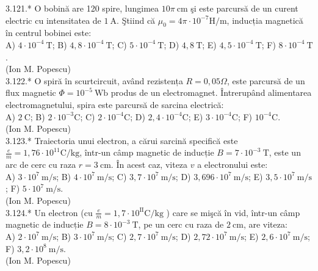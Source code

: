 3.121.* O bobină are 120 spire, lungimea $10 \pi \mathrm{~cm}$ şi este parcursă de un curent electric cu intensitatea de $1 \mathrm{~A}$. Ştiind că $\mu_{0}=4 \pi \cdot 10^{-7} \mathrm{H} / \mathrm{m}$, inducția magnetică în centrul bobinei este:\\ A) $4 \cdot 10^{-4} \mathrm{~T}$; B) $4,8 \cdot 10^{-4} \mathrm{~T}$; C) $5 \cdot 10^{-4} \mathrm{~T}$; D) $4,8 \mathrm{~T}$; E) $4,5 \cdot 10^{-4} \mathrm{~T}$; F) $8 \cdot 10^{-4} \mathrm{~T}$.\\ (Ion M. Popescu)\\

3.122.* O spiră în scurtcircuit, având rezistența $R=0,05 \Omega$, este parcursă de un flux magnetic $\Phi=10^{-5} \mathrm{~Wb}$ produs de un electromagnet. Întrerupând alimentarea electromagnetului, spira este parcursă de sarcina electrică:\\ A) $2 \mathrm{~C}$; B) $2 \cdot 10^{-3} \mathrm{C}$; C) $2 \cdot 10^{-4} \mathrm{C}$; D) $2,4 \cdot 10^{-4} \mathrm{C}$; E) $3 \cdot 10^{-4} \mathrm{C}$; F) $10^{-4} \mathrm{C}$.\\ (Ion M. Popescu)\\

3.123.* Traiectoria unui electron, a cărui sarcină specifică este $\frac{e}{m}=1,76 \cdot 10^{11} \mathrm{C} / \mathrm{kg}$, într-un câmp magnetic de inducție $B=7 \cdot 10^{-3} \mathrm{~T}$, este un arc de cerc cu raza $r=3 \mathrm{~cm}$. În acest caz, viteza $v$ a electronului este:\\ A) $3 \cdot 10^{7} \mathrm{~m} / \mathrm{s}$; B) $4 \cdot 10^{7} \mathrm{~m} / \mathrm{s}$; C) $3,7 \cdot 10^{7} \mathrm{~m} / \mathrm{s}$; D) $3,696 \cdot 10^{7} \mathrm{~m} / \mathrm{s}$; E) $3,5 \cdot 10^{7} \mathrm{~m} / \mathrm{s}$; F) $5 \cdot 10^{7} \mathrm{~m} / \mathrm{s}$.\\ (Ion M. Popescu)\\

3.124.* Un electron (cu $\frac{e}{m}=1,7 \cdot 10^{\mathrm{II}} \mathrm{C} / \mathrm{kg}$ ) care se mişcă în vid, într-un câmp magnetic de inducție $B=8 \cdot 10^{-3} \mathrm{~T}$, pe un cerc cu raza de $2 \mathrm{~cm}$, are viteza:\\ A) $2 \cdot 10^{7} \mathrm{~m} / \mathrm{s}$; B) $3 \cdot 10^{7} \mathrm{~m} / \mathrm{s}$; C) $2,7 \cdot 10^{7} \mathrm{~m} / \mathrm{s}$; D) $2,72 \cdot 10^{7} \mathrm{~m} / \mathrm{s}$; E) $2,6 \cdot 10^{7} \mathrm{~m} / \mathrm{s}$; F) $3,2 \cdot 10^{8} \mathrm{~m} / \mathrm{s}$.\\ (Ion M. Popescu)\\

